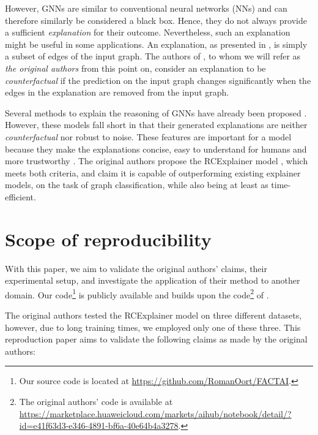 However, GNNs are similar to conventional neural networks (NNs) and can therefore similarly be considered a black box. Hence, they do not always provide a sufficient \textit{explanation} for their outcome. Nevertheless, such an explanation might be useful in some applications. An explanation, as presented in \cite{bajaj2021robust}, is simply a subset of edges of the input graph. The authors of \cite{bajaj2021robust}, to whom we will refer as \textit{the original authors} from this point on, consider an explanation to be \textit{counterfactual} if the prediction on the input graph changes significantly when the edges in the explanation are removed from the input graph.
  
Several methods to explain the reasoning of GNNs have already been proposed \cite{velickovic2018graph, ying2019gnnexplainer, Pope2019ExplainabilityMF,  luo2020parameterized}. However, these models fall short in that their generated explanations are neither \textit{counterfactual} nor robust to noise. These features are important for a model because they make the explanations concise, easy to understand for humans and more trustworthy \cite{bajaj2021robust}. The original authors propose the RCExplainer model \cite{bajaj2021robust}, which meets both criteria, and claim it is capable of outperforming existing explainer models, on the task of graph classification, while also being at least as time-efficient.

\section{Scope of reproducibility} \label{sec:claims}

With this paper, we aim to validate the original authors' claims, their experimental setup, and investigate the application of their method to another domain. Our code\footnote{Our source code is located at \href{https://github.com/RomanOort/FACTAI}{https://github.com/RomanOort/FACTAI}.} is publicly available and builds upon the code\footnote{The original authors' code is available at \href{https://marketplace.huaweicloud.com/markets/aihub/notebook/detail/?id=e41f63d3-e346-4891-bf6a-40e64b4a3278}{https://marketplace.huaweicloud.com/markets/aihub/notebook/detail/?id=e41f63d3-e346-4891-bf6a-40e64b4a3278}.} of \citep{bajaj2021robust}.

The original authors tested the RCExplainer model on three different datasets, however, due to long training times, we employed only one of these three. This reproduction paper aims to validate the following claims as made by the original authors:


